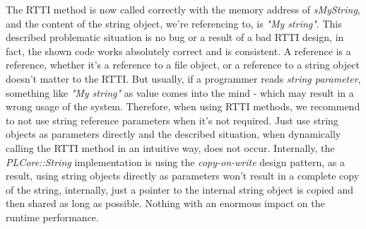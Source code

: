 The RTTI method is now called correctly with the memory address of \emph{sMyString}, and the content of the string object, we're referencing to, is \emph{"My string"}. This described problematic situation is no bug or a result of a bad RTTI design, in fact, the shown code works absolutely correct and is consistent. A reference is a reference, whether it's a reference to a file object, or a reference to a string object doesn't matter to the RTTI. But usually, if a programmer reads \emph{string parameter}, something like \emph{"My string"} as value comes into the mind - which may result in a wrong usage of the system. Therefore, when using RTTI methods, we recommend to not use string reference parameters when it's not required. Just use string objects as parameters directly and the described situation, when dynamically calling the RTTI method in an intuitive way, does not occur. Internally, the \emph{PLCore::String} implementation is using the \emph{copy-on-write} design pattern, as a result, using string objects directly as parameters won't result in a complete copy of the string, internally, just a pointer to the internal string object is copied and then shared as long as possible. Nothing with an enormous impact on the runtime performance.

